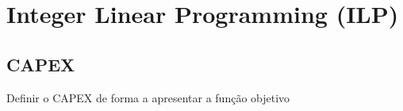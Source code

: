 
\chapter{Integer Linear Programming (ILP)}

\section{CAPEX}

Definir o CAPEX de forma a apresentar a função objetivo




